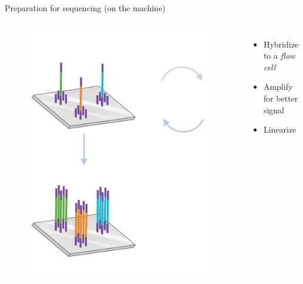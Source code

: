 \documentclass[10pt]{beamer}
\begin{document}
\begin{frame}[standout]{Preparation for sequencing (on the machine)}
	\begin{columns}[T,onlytextwidth]
		\hspace*{-0.7cm} 
		\begin{figure}
			\includegraphics[width=\textwidth]{figures/bridge-amp.png}
		\end{figure}
		\normalsize \normalfont
		\begin{itemize}
			\item Hybridize to a \emph{flow cell} 
			\item Amplify for better signal
			\item Linearize
		\end{itemize}
		\vspace{1cm} \par

\end{columns}
\end{frame}
\end{document}
